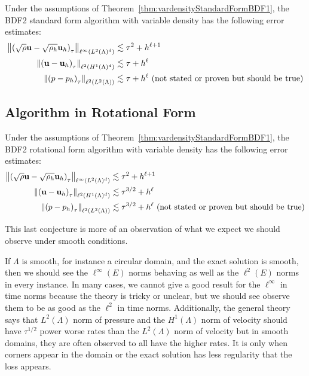 \documentclass[letterpaper]{erdc}
\begin{document}
\begin{conjecture}
  Under the assumptions of Theorem~\ref{thm:vardensityStandardFormBDF1}, the
  BDF2 standard form algorithm with variable density has the following error
  estimates:
  \begin{align}
    \left\| \left(\sqrt{\rho} \textbf{u} - \sqrt{\rho_h} \textbf{u}_h \right)_{\tau} \right\|_{\ell^{\infty}(L^2(\Lambda)^d)} &\lesssim \tau^2 + h^{\ell+1}\\
    \left\| \left(\textbf{u} - \textbf{u}_h \right)_{\tau} \right\|_{\ell^2(H^1(\Lambda)^d)} &\lesssim \tau + h^{\ell}\\
    \left\|\left(p - p_h\right)_{\tau} \right\|_{\ell^{2}(L^2(\Lambda))} &\lesssim \tau + h^{\ell}  \mbox{  (not stated or proven but should be true)}
  \end{align}
\end{conjecture}

%
%
\subsection{Algorithm in Rotational Form}

\begin{conjecture}
  Under the assumptions of Theorem~\ref{thm:vardensityStandardFormBDF1}, the BDF2 rotational form algorithm with variable density has the following error estimates:
  \begin{align}
    \left\| \left(\sqrt{\rho} \textbf{u} - \sqrt{\rho_h} \textbf{u}_h \right)_{\tau} \right\|_{\ell^{\infty}(L^2(\Lambda)^d)} &\lesssim \tau^2 + h^{\ell+1}\\
    \left\| \left( \textbf{u} - \textbf{u}_h \right)_{\tau} \right\|_{\ell^2(H^1(\Lambda)^d)} &\lesssim \tau^{3/2} + h^{\ell}\\
    \left\|\left(p - p_h\right)_{\tau} \right\|_{\ell^{2}(L^2(\Lambda))} &\lesssim \tau^{3/2} + h^{\ell}  \mbox{  (not stated or proven but should be true)}
  \end{align}
\end{conjecture}

This last conjecture is more of an observation of what we expect we should
observe under smooth conditions.
\begin{conjecture}
  If $\Lambda$ is smooth, for instance a circular domain, and the exact
  solution is smooth, then we should see the $\ell^{\infty}(E)$ norms behaving
  as well as the $\ell^{2}(E)$ norms in every instance.  In many cases, we
  cannot give a good result for the $\ell^{\infty}$ in time norms because the
  theory is tricky or unclear, but we should see observe them to be as good as
  the $\ell^2$ in time norms.  Additionally, the general theory says that
  $L^{2}(\Lambda)$ norm of pressure and the $H^1(\Lambda)$ norm of velocity
  should have $\tau^{1/2}$ power worse rates than the $L^2(\Lambda)$ norm of
  velocity but in smooth domains, they are often observed to all have the
  higher rates.  It is only when corners appear in the domain or the exact
  solution has less regularity that the loss appears.
\end{conjecture}
\end{document}
